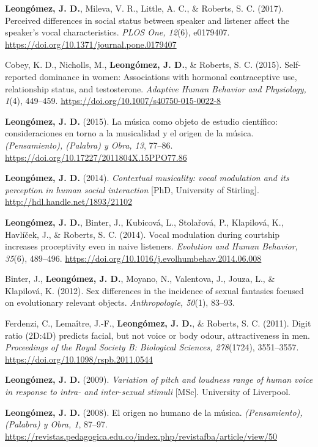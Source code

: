 \documentclass[11pt,a4paper,]{awesome-cv}
\begin{document}
\textbf{Leongómez, J. D.}, Mileva, V. R., Little, A. C., \& Roberts, S.
C. (2017). Perceived differences in social status between speaker and
listener affect the speaker's vocal characteristics. \emph{PLOS One,
12}(6), e0179407. \url{https://doi.org/10.1371/journal.pone.0179407}

Cobey, K. D., Nicholls, M., \textbf{Leongómez, J. D.}, \& Roberts, S. C.
(2015). Self-reported dominance in women: Associations with hormonal
contraceptive use, relationship status, and testosterone. \emph{Adaptive
Human Behavior and Physiology, 1}(4), 449--459.
\url{https://doi.org/10.1007/s40750-015-0022-8}

\textbf{Leongómez, J. D.} (2015). La música como objeto de estudio
científico: consideraciones en torno a la musicalidad y el origen de la
música. \emph{(Pensamiento), (Palabra) y Obra, 13}, 77--86.
\url{https://doi.org/10.17227/2011804X.15PPO77.86}

\textbf{Leongómez, J. D.} (2014). \emph{Contextual musicality: vocal
modulation and its perception in human social interaction} {[}PhD,
University of Stirling{]}. \url{http://hdl.handle.net/1893/21102}

\textbf{Leongómez, J. D.}, Binter, J., Kubicová, L., Stolařová, P.,
Klapilová, K., Havlíček, J., \& Roberts, S. C. (2014). Vocal modulation
during courtship increases proceptivity even in naive listeners.
\emph{Evolution and Human Behavior, 35}(6), 489--496.
\url{https://doi.org/10.1016/j.evolhumbehav.2014.06.008}

Binter, J., \textbf{Leongómez, J. D.}, Moyano, N., Valentova, J., Jouza,
L., \& Klapilová, K. (2012). Sex differences in the incidence of sexual
fantasies focused on evolutionary relevant objects. \emph{Anthropologie,
50}(1), 83--93.

Ferdenzi, C., Lemaître, J.-F., \textbf{Leongómez, J. D.}, \& Roberts, S.
C. (2011). Digit ratio (2D:4D) predicts facial, but not voice or body
odour, attractiveness in men. \emph{Proceedings of the Royal Society B:
Biological Sciences, 278}(1724), 3551--3557.
\url{https://doi.org/10.1098/rspb.2011.0544}

\textbf{Leongómez, J. D.} (2009). \emph{Variation of pitch and loudness
range of human voice in response to intra- and inter-sexual stimuli}
{[}MSc{]}. University of Liverpool.

\textbf{Leongómez, J. D.} (2008). El origen no humano de la música.
\emph{(Pensamiento), (Palabra) y Obra, 1}, 87--97.
\url{https://revistas.pedagogica.edu.co/index.php/revistafba/article/view/50}
\end{document}
